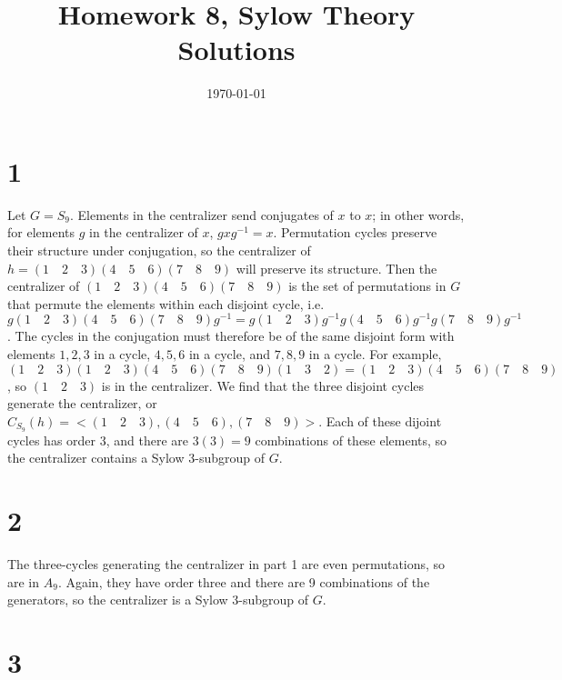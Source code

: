 \documentclass{article}
\title{\textbf{Homework 8, Sylow Theory Solutions}}
\date{}
\date\today
\begin{document}
\maketitle %

\thispagestyle{firstpage}
\section*{1}

Let $G = S_9$.  Elements in the centralizer send conjugates of $x$ to $x$; in other words, 
for elements $g$ in the centralizer of $x$, $gxg^{-1} = x$.  Permutation cycles preserve their structure under conjugation, so 
the centralizer of $h = (1 \quad 2 \quad 3)(4 \quad 5 \quad 6)(7 \quad 8 \quad 9)$ will preserve its structure.
Then the centralizer of $(1 \quad 2 \quad 3)(4 \quad 5 \quad 6)(7 \quad 8 \quad 9)$ is the set of permutations in $G$ that 
permute the elements within each disjoint cycle, i.e. \\
$g (1 \quad 2 \quad 3)(4 \quad 5 \quad 6)(7 \quad 8 \quad 9) g^{-1} = 
g (1 \quad 2 \quad 3)g^{-1}g(4 \quad 5 \quad 6)g^{-1}g(7 \quad 8 \quad 9) g^{-1}$.
The cycles in the conjugation must therefore be of the same disjoint form with elements 
$1, 2, 3$ in a cycle, $4, 5, 6$ in a cycle, and $7, 8, 9$ in a cycle.  For example, 
$(1 \quad 2 \quad 3)(1 \quad 2 \quad 3)(4 \quad 5 \quad 6)(7 \quad 8 \quad 9)(1 \quad 3 \quad 2) = 
(1 \quad 2 \quad 3)(4 \quad 5 \quad 6)(7 \quad 8 \quad 9)$, so $(1 \quad 2 \quad 3)$ is 
in the centralizer.  We find that the three disjoint cycles generate the centralizer, 
or $C_{S_9}(h) = <(1 \quad 2 \quad 3), (4 \quad 5 \quad 6), (7 \quad 8 \quad 9)>$.  Each of these 
dijoint cycles has order 3, and there are $3(3) = 9$ combinations of these elements, 
so the centralizer contains a Sylow 3-subgroup of $G$.


\section*{2}

The three-cycles generating the centralizer in part 1 are even permutations, so are in 
$A_9$.  Again, they have order three and there are 9 combinations of the generators, 
so the centralizer is a Sylow 3-subgroup of $G$.

\section*{3}
\end{document}
